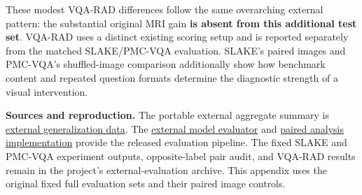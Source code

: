\documentclass[
  10pt,
  a4paper,
]{article}
\begin{document}
These modest VQA-RAD differences follow the same overarching external
pattern: the substantial original MRI gain \textbf{is absent from this
additional test set}. VQA-RAD uses a distinct existing scoring setup and
is reported separately from the matched SLAKE/PMC-VQA evaluation.
SLAKE's paired images and PMC-VQA's shuffled-image comparison
additionally show how benchmark content and repeated question formats
determine the diagnostic strength of a visual intervention.

\textbf{Sources and reproduction.} The portable external aggregate
summary is
\href{https://github.com/bbuller591-sketch/medical-vlm-visual-reliance/blob/main/results/external_base_rl_generalization_audit.json}{external
generalization data}. The
\href{https://github.com/bbuller591-sketch/medical-vlm-visual-reliance/blob/main/scripts/evaluate_external.py}{external
model evaluator} and
\href{https://github.com/bbuller591-sketch/medical-vlm-visual-reliance/blob/main/scripts/analyze_inference.py}{paired
analysis implementation} provide the released evaluation pipeline. The
fixed SLAKE and PMC-VQA experiment outputs, opposite-label pair audit,
and VQA-RAD results remain in the project's external-evaluation archive.
This appendix uses the original fixed full evaluation sets and their
paired image controls.
\end{document}
